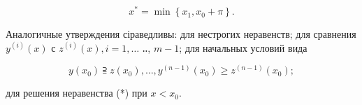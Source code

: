 \documentclass[10pt]{article}
\begin{document}
\[

x^{*}=\min \left\{x_{1}, x_{0}+\pi\right\} .

\]



Аналогичные утверждения сіраведливы: для нестрогих неравенств; для сравнения $y^{(i)}(x)$ с $z^{(i)}(x), i=1, \ldots$ ‥, $m-1$; для начальных условий вида



\[

y\left(x_{0}\right) \supseteqq z\left(x_{0}\right), \ldots, y^{(n-1)}\left(x_{0}\right) \geqslant z^{(n-1)}\left(x_{0}\right) ;

\]



для решения неравенства (*) при $x<x_{0}$.
\end{document}
